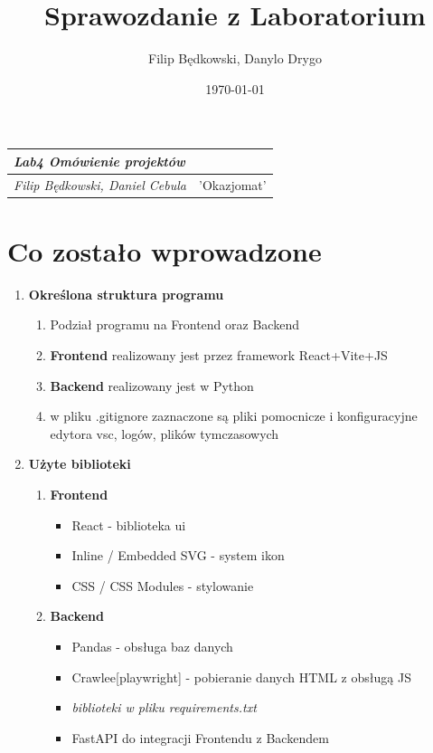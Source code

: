 \documentclass[12pt, a4paper]{article}
\title{Sprawozdanie z Laboratorium}
\author{Filip Będkowski, Danylo Drygo}
\date{\today}
\begin{document}
\noindent
\begin{tabular}{|p{}|p{}|}
    \hline
    \multicolumn{2}{|l|}{\textit{Lab4 Omówienie projektów}} \\ \hline
    \textit{Filip Będkowski, Daniel Cebula} & {'Okazjomat'} \\ \hline
\end{tabular}

\vspace{0.8cm}

\section*{Co zostało wprowadzone}

\begin{enumerate}[label=\arabic*.]
    \item \textbf{Określona struktura programu}
    \begin{enumerate}
        \item Podział programu na Frontend oraz Backend
        \item \textbf{Frontend} realizowany jest przez framework React+Vite+JS 
        \item \textbf{Backend} realizowany jest w Python
        \item w pliku .gitignore zaznaczone są pliki pomocnicze i konfiguracyjne edytora vsc, logów, plików tymczasowych
    \end{enumerate}

    \item \textbf{Użyte biblioteki}
    \begin{enumerate}[label=\arabic{enumi}.\arabic*.]
        \item \textbf{Frontend}
        \begin{itemize}[label=--]
            \item React - biblioteka ui
            \item Inline / Embedded SVG - system ikon
            \item CSS / CSS Modules - stylowanie
        \end{itemize}
        \item \textbf{Backend}
        \begin{itemize}[label=--]
            \item Pandas - obsługa baz danych
            \item Crawlee[playwright] - pobieranie danych HTML z obsługą JS
            \item \textsl{biblioteki w pliku requirements.txt}
            \item FastAPI do integracji Frontendu z Backendem
        \end{itemize}
    \end{enumerate}


\end{enumerate}
\end{document}
